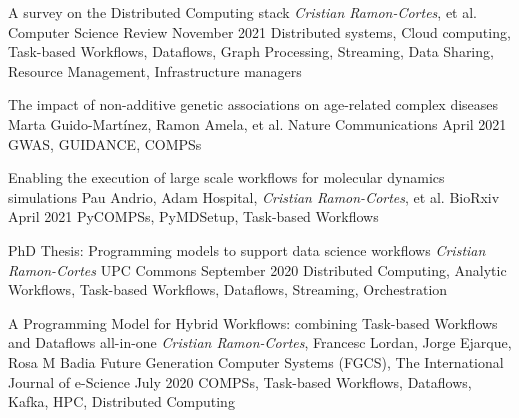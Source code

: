 %
%
%

\newpage


\begin{publications}
    
    \publication
        {A survey on the Distributed Computing stack}
        {\textit{Cristian Ramon-Cortes}, et al.}
        {Computer Science Review}
        {November 2021}
        {Distributed systems, Cloud computing, Task-based Workflows, Dataflows, Graph Processing, Streaming, Data Sharing, Resource Management, Infrastructure managers}
        {}
    
    \publication
        {The impact of non-additive genetic associations on age-related complex diseases}
        {Marta Guido-Martínez, Ramon Amela, et al.}
        {Nature Communications}
        {April 2021}
        {GWAS, GUIDANCE, COMPSs}
        {}
    
    \publication
        {Enabling the execution of large scale workflows for molecular dynamics simulations}
        {Pau Andrio, Adam Hospital, \textit{Cristian Ramon-Cortes}, et al.}
        {BioRxiv}
        {April 2021}
        {PyCOMPSs, PyMDSetup, Task-based Workflows}
        {}
    
   \publication
        {PhD Thesis: Programming models to support data science workflows}
        {\textit{Cristian Ramon-Cortes}}
        {UPC Commons}
        {September 2020}
        {Distributed Computing, Analytic Workflows, Task-based Workflows, Dataflows, Streaming, Orchestration}
        {}
    
    \publication
        {A Programming Model for Hybrid Workflows: combining Task-based Workflows and Dataflows all-in-one}
        {\textit{Cristian Ramon-Cortes}, Francesc Lordan, Jorge Ejarque, Rosa M Badia}
        {Future Generation Computer Systems (FGCS), The International Journal of e-Science}
        {July 2020}
        {COMPSs, Task-based Workflows, Dataflows, Kafka, HPC, Distributed Computing}
        {}


\end{publications}

